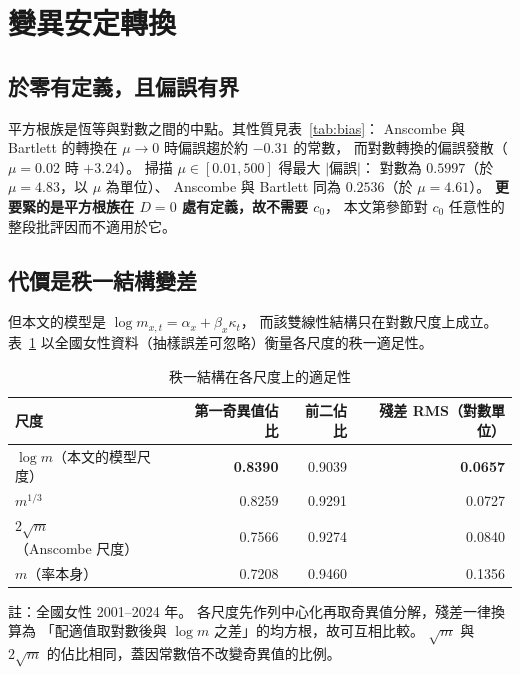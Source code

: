 \documentclass[UTF8, fontset=macnew, a4paper, 12pt]{ctexart}
\begin{document}
\section{變異安定轉換}\label{sec:vst}

\subsection{於零有定義，且偏誤有界}\label{subsec:vstbias}

平方根族是恆等與對數之間的中點。其性質見表~\ref{tab:bias}：
Anscombe 與 Bartlett 的轉換在 $\mu\to0$ 時偏誤趨於約 $-0.31$ 的常數，
而對數轉換的偏誤發散（$\mu=0.02$ 時 $+3.24$）。
掃描 $\mu\in[0.01,500]$ 得最大 $|$偏誤$|$：
對數為 $0.5997$（於 $\mu=4.83$，以 $\mu$ 為單位）、
Anscombe 與 Bartlett 同為 $0.2536$（於 $\mu=4.61$）。
\textbf{更要緊的是平方根族在 $D=0$ 處有定義，故不需要 $c_0$}，
本文第參節對 $c_0$ 任意性的整段批評因而不適用於它。

\subsection{代價是秩一結構變差}\label{subsec:rankone}

但本文的模型是 $\log m_{x,t}=\alpha_x+\beta_x\kappa_t$，
而該雙線性結構只在對數尺度上成立。
表~\ref{tab:rankone} 以全國女性資料（抽樣誤差可忽略）衡量各尺度的秩一適足性。

\begin{table}[H]
\centering
\caption{秩一結構在各尺度上的適足性}
\small
\renewcommand{\arraystretch}{1.1}
\begin{tabular}{lrrr}
\toprule
尺度 & 第一奇異值佔比 & 前二佔比 & 殘差 RMS（對數單位）\\
\midrule
$\log m$（本文的模型尺度） & \textbf{0.8390} & 0.9039 & \textbf{0.0657}\\
$m^{1/3}$ & 0.8259 & 0.9291 & 0.0727\\
$2\sqrt{m}$（Anscombe 尺度） & 0.7566 & 0.9274 & 0.0840\\
$m$（率本身） & 0.7208 & 0.9460 & 0.1356\\
\bottomrule
\end{tabular}

\vspace{2pt}
\parbox{0.92\textwidth}{\footnotesize 註：全國女性 2001--2024 年。
各尺度先作列中心化再取奇異值分解，殘差一律換算為
「配適值取對數後與 $\log m$ 之差」的均方根，故可互相比較。
$\sqrt m$ 與 $2\sqrt m$ 的佔比相同，蓋因常數倍不改變奇異值的比例。}
\label{tab:rankone}
\end{table}
\end{document}
